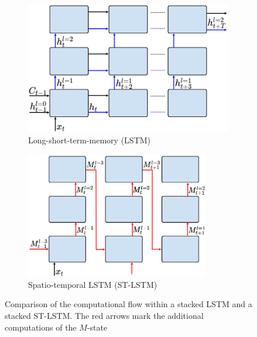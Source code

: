 \begin{figure}
\centering
\begin{subfigure}{.5\textwidth}
  \centering
  \includegraphics[width=0.99\textwidth]{figures/lstm}
  \caption{Long-short-term-memory (LSTM)}
  \label{fig:sub1}
\end{subfigure}%
\begin{subfigure}{.5\textwidth}
  \centering
  \includegraphics[width=0.88\textwidth]{figures/stlstm}
  \caption{Spatio-temporal LSTM (ST-LSTM)}
  \label{fig:sub2}
\end{subfigure}
\caption{Comparison of the computational flow within a stacked LSTM and a stacked ST-LSTM. The red arrows mark the additional computations of the $M$-state}
\label{fig:stlstmcell}
\end{figure}



